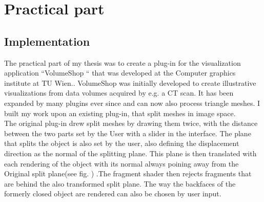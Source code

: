 \chapter{Practical part}
\section{Implementation}
The practical part of my thesis was to create a plug-in for the visualization application ``VolumeShop `` that was developed at the Computer graphics institute at TU Wien.\cite{bruckner-2005-VIS}. VolumeShop was initially developed to create illustrative visualizations from data volumes acquired by e.g. a CT scan. It has been expanded by many plugins ever since and can now also process triangle meshes. I built my work upon an existing plug-in\cite{schwankl-2013-smis}, that split meshes in image space.\\
 The original plug-in drew split meshes by drawing them twice, with the distance between the two parts set by the User with a slider in the interface. The plane  that splits the object is also set by the user, also defining the displacement direction as the normal of the splitting plane. This plane is then translated with each rendering of the object with its normal always poining away from the Original split plane(see fig. \label{fig:splitting_explained}) .The fragment shader then rejects fragments that are behind the also transformed split plane. The way the backfaces of the formerly closed object are rendered can also be chosen by user input.\\
